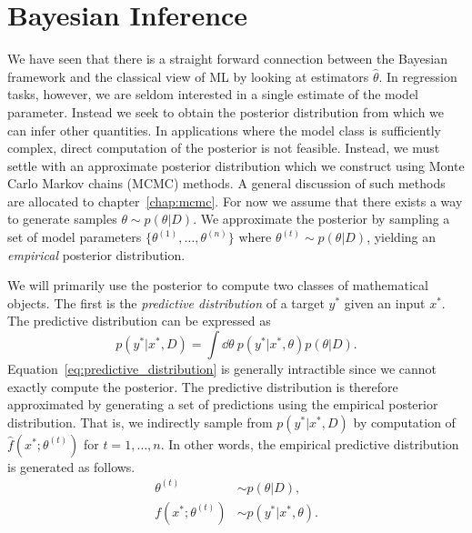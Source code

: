 \section{Bayesian Inference}
We have seen that there is a straight forward connection between the Bayesian framework
and the classical view of ML by looking at estimators $\hat{\theta}$. 
In regression tasks, however, we are seldom interested in a single estimate of the model parameter.
Instead we seek to obtain the posterior distribution from which we can infer other quantities.
In applications where the model class is sufficiently complex, direct computation
of the posterior is not feasible. Instead, we must settle with an approximate posterior distribution
which we construct using Monte Carlo Markov chains (MCMC) methods. 
A general discussion of such methods are allocated to chapter~\ref{chap:mcmc}. For now we assume that there
exists a way to generate samples $\theta \sim p(\theta|D)$. We approximate the posterior
by sampling a set of model parameters $\{\theta^{(1)}, \ldots, \theta^{(n)}\}$ where $\theta^{(t)} \sim p(\theta|D)$, 
yielding an \textit{empirical} posterior distribution. 

We will primarily use the posterior to compute two classes of mathematical objects. 
The first is the \textit{predictive distribution} of a target $y^*$ given
an input $x^*$. The predictive distribution can be expressed as
\begin{equation}\label{eq:predictive_distribution}
    p(y^*|x^*, D) = \int \dd\theta \ p(y^*|x^*, \theta)p(\theta|D).
\end{equation}
Equation~\eqref{eq:predictive_distribution} is generally intractible since we cannot exactly compute the posterior.
The predictive distribution is therefore approximated by generating a set of predictions
using the empirical posterior distribution. That is, we indirectly sample from $p(y^*|x^*, D)$
by computation of $\hat{f}(x^*;\theta^{(t)})$ for $t=1,\ldots,n$. In other words, the empirical predictive distribution
is generated as follows.
\begin{equation}
    \begin{split}
        \theta^{(t)} & \sim p(\theta|D), \\
        f(x^*;\theta^{(t)}) & \sim p(y^*|x^*, \theta).
    \end{split}
\end{equation}


